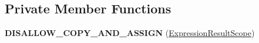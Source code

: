 \subsection*{Private Member Functions}
\begin{DoxyCompactItemize}
\item 
{\bfseries D\+I\+S\+A\+L\+L\+O\+W\+\_\+\+C\+O\+P\+Y\+\_\+\+A\+N\+D\+\_\+\+A\+S\+S\+I\+GN} (\hyperlink{classv8_1_1internal_1_1interpreter_1_1_bytecode_generator_1_1_expression_result_scope}{Expression\+Result\+Scope})\hypertarget{classv8_1_1internal_1_1interpreter_1_1_bytecode_generator_1_1_expression_result_scope_a64f282a14d0c0c2cdf771716646c09d6}{}\label{classv8_1_1internal_1_1interpreter_1_1_bytecode_generator_1_1_expression_result_scope_a64f282a14d0c0c2cdf771716646c09d6}

\end{DoxyCompactItemize}
